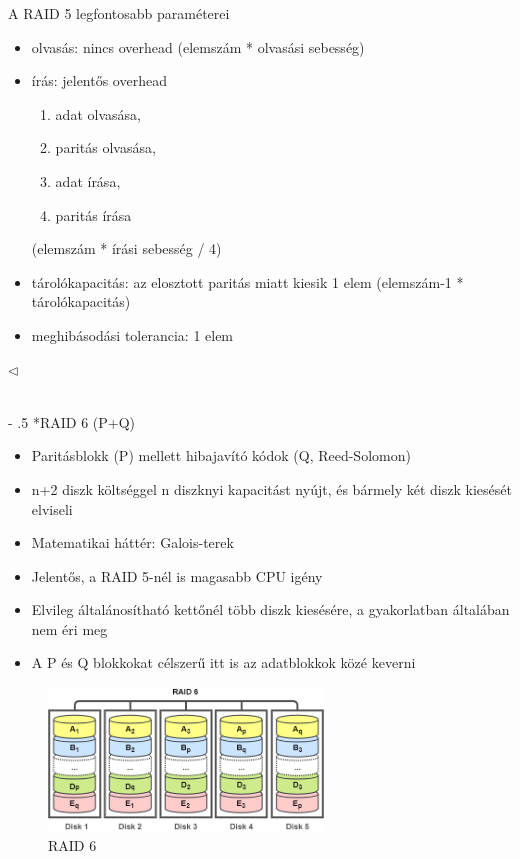 \documentclass[tikz,12pt,margin=0px]{article}
\makeatletter
\renewcommand\paragraph{%
	\@startsection{paragraph}{4}{0mm}%
	{-\baselineskip}%
	{.5\baselineskip}%
	{\normalfont\normalsize\bfseries}}
\makeatother
\begin{document}
{    \noindent A RAID 5 legfontosabb paraméterei
    \begin{itemize}[topsep=8pt,itemsep=4pt,partopsep=4pt, parsep=4pt]
        \item olvasás: nincs overhead (elemszám * olvasási sebesség)
        \item írás: jelentős overhead
        \begin{enumerate}
            \item adat olvasása,
            \item paritás olvasása,
            \item adat írása,
            \item paritás írása
        \end{enumerate}
        (elemszám * írási sebesség / 4)
        \item tárolókapacitás: az elosztott paritás miatt kiesik 1 elem (elemszám-1 * tárolókapacitás)
        \item meghibásodási tolerancia: 1 elem
    \end{itemize}
    $\triangleleft$ \faLightbulbO}\\

    \paragraph*{RAID 6 (P+Q)}

    \begin{itemize}[topsep=8pt,itemsep=4pt,partopsep=4pt, parsep=4pt]
        \item Paritásblokk (P) mellett hibajavító kódok (Q, Reed-Solomon)
        \item n+2 diszk költséggel n diszknyi kapacitást nyújt, és bármely két diszk kiesését elviseli
        \item Matematikai háttér: Galois-terek
        \item Jelentős, a RAID 5-nél is magasabb CPU igény
        \item Elvileg általánosítható kettőnél több diszk kiesésére, a gyakorlatban általában nem éri meg
        \item A P és Q blokkokat célszerű itt is az adatblokkok közé keverni
    \end{itemize}

    \begin{figure}[H]
        \centering
        \includegraphics[width=0.65\textwidth]{img/raid6.png}
        \caption{RAID 6}
        \label{ref:raid6}
    \end{figure}
\end{document}
